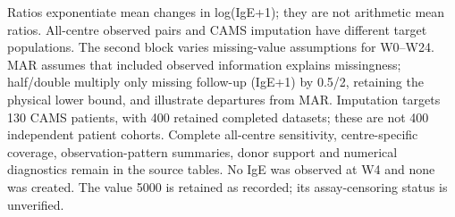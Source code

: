 \noindent\footnotesize Ratios exponentiate mean changes in log(IgE+1); they are not arithmetic mean ratios. All-centre observed pairs and CAMS imputation have different target populations. The second block varies missing-value assumptions for W0--W24. MAR assumes that included observed information explains missingness; half/double multiply only missing follow-up (IgE+1) by 0.5/2, retaining the physical lower bound, and illustrate departures from MAR. Imputation targets 130 CAMS patients, with 400 retained completed datasets; these are not 400 independent patient cohorts. Complete all-centre sensitivity, centre-specific coverage, observation-pattern summaries, donor support and numerical diagnostics remain in the source tables. No IgE was observed at W4 and none was created. The value 5000 is retained as recorded; its assay-censoring status is unverified.\normalsize
